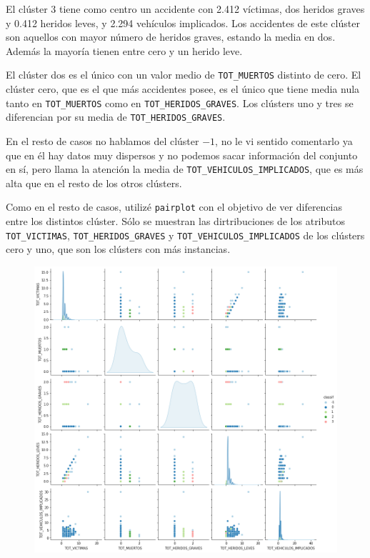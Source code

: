 \documentclass[a4]{article}
\begin{document}
El clúster 3 tiene como centro un accidente con 2.412 víctimas, dos heridos graves y 0.412 heridos leves, y 2.294 vehículos implicados. Los accidentes de este clúster son aquellos con mayor número de heridos graves, estando la media en dos. Además la mayoría tienen entre cero y un herido leve.

El clúster dos es el único con un valor medio de \texttt{TOT\_MUERTOS} distinto de cero. El clúster cero, que es el que más accidentes posee, es el único que tiene media nula tanto en \texttt{TOT\_MUERTOS} como en \texttt{TOT\_HERIDOS\_GRAVES}. Los clústers uno y tres se diferencian por su media de \texttt{TOT\_HERIDOS\_GRAVES}.

En el resto de casos no hablamos del clúster $-1$, no le vi sentido comentarlo ya que en él hay datos muy dispersos y no podemos sacar información del conjunto en sí, pero llama la atención la media de \texttt{TOT\_VEHICULOS\_IMPLICADOS}, que es más alta que en el resto de los otros clústers.

Como en el resto de casos, utilizé \texttt{pairplot} con el objetivo de ver diferencias entre los distintos clúster. Sólo se muestran las dirtribuciones de los atributos \texttt{TOT\_VICTIMAS}, \texttt{TOT\_HERIDOS\_GRAVES} y \texttt{TOT\_VEHICULOS\_IMPLICADOS} de los clústers cero y uno, que son los clústers con más instancias.

\begin{figure}[H]
  \centering
  \includegraphics[width=149mm]{imagenes/c3_dbscan_pairplot}
\end{figure}
\end{document}
